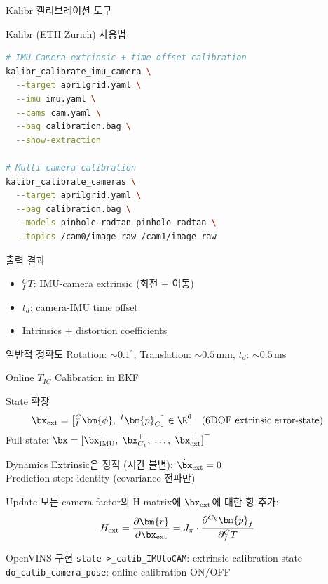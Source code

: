 \begin{frame}[fragile,shrink=10]{Kalibr 캘리브레이션 도구}
  \begin{block}{Kalibr (ETH Zurich) 사용법}
\begin{lstlisting}[language=bash]
# IMU-Camera extrinsic + time offset calibration
kalibr_calibrate_imu_camera \
  --target aprilgrid.yaml \
  --imu imu.yaml \
  --cams cam.yaml \
  --bag calibration.bag \
  --show-extraction

# Multi-camera calibration
kalibr_calibrate_cameras \
  --target aprilgrid.yaml \
  --bag calibration.bag \
  --models pinhole-radtan pinhole-radtan \
  --topics /cam0/image_raw /cam1/image_raw
\end{lstlisting}
  \end{block}
  \begin{block}{출력 결과}
    \begin{itemize}
      \item ${}^C_I T$: IMU-camera extrinsic (회전 + 이동)
      \item $t_d$: camera-IMU time offset
      \item Intrinsics + distortion coefficients
    \end{itemize}
  \end{block}
  \begin{exampleblock}{일반적 정확도}
    Rotation: $\sim 0.1^\circ$, Translation: $\sim 0.5$\,mm, $t_d$: $\sim 0.5$\,ms
  \end{exampleblock}
\end{frame}


\begin{frame}[shrink=10]{Online $T_{IC}$ Calibration in EKF}
  \begin{block}{State 확장}
    \begin{align*}
      \bx_{\text{ext}} &= \bigl[{}^C_I\bm{\phi},\; {}^I\bm{p}_C\bigr] \in \R^6
      \quad \text{(6DOF extrinsic error-state)}
    \end{align*}
    Full state: $\bx = [\bx_{\text{IMU}}^\top,\; \bx_{C_1}^\top,\; \ldots,\; \bx_{\text{ext}}^\top]^\top$
  \end{block}
  \begin{block}{Dynamics}
    Extrinsic은 정적 (시간 불변): $\dot{\bx}_{\text{ext}} = 0$\\
    Prediction step: identity (covariance 전파만)
  \end{block}
  \begin{block}{Update}
    모든 camera factor의 H matrix에 $\bx_{\text{ext}}$에 대한 항 추가:
    \begin{align*}
      H_{\text{ext}} &= \frac{\partial \bm{r}}{\partial \bx_{\text{ext}}}
      = J_\pi \cdot \frac{\partial {}^{C_k}\bm{p}_f}{\partial {}^C_I T}
    \end{align*}
  \end{block}
  \begin{exampleblock}{OpenVINS 구현}
    \texttt{state->\_calib\_IMUtoCAM}: extrinsic calibration state\\
    \texttt{do\_calib\_camera\_pose}: online calibration ON/OFF
  \end{exampleblock}
\end{frame}


